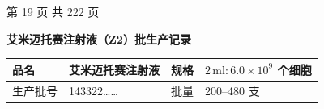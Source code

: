 \documentclass[UTF8,10pt,a4paper,fontset=fandol]{ctexart}
\newcommand{\fieldvalue}[1]{#1}
\newcommand{\handwritten}[1]{#1}
\begin{document}
\noindent\hfill 第 19 页 共 222 页

\newpage

\begin{center}
\textbf{艾米迈托赛注射液（Z2）批生产记录}
\end{center}

\begin{tabularx}{\textwidth}{|p{}|X|p{}|X|}
\hline
品名 & 艾米迈托赛注射液 & 规格 & $2\,\mathrm{ml}\colon 6.0\times10^{9}$ 个细胞 \\
\hline
生产批号 &
\fieldvalue{\handwritten{143322……}} &
批量 & 200--480 支 \\
\hline
\end{tabularx}

\vspace{0.2em}
\end{document}
